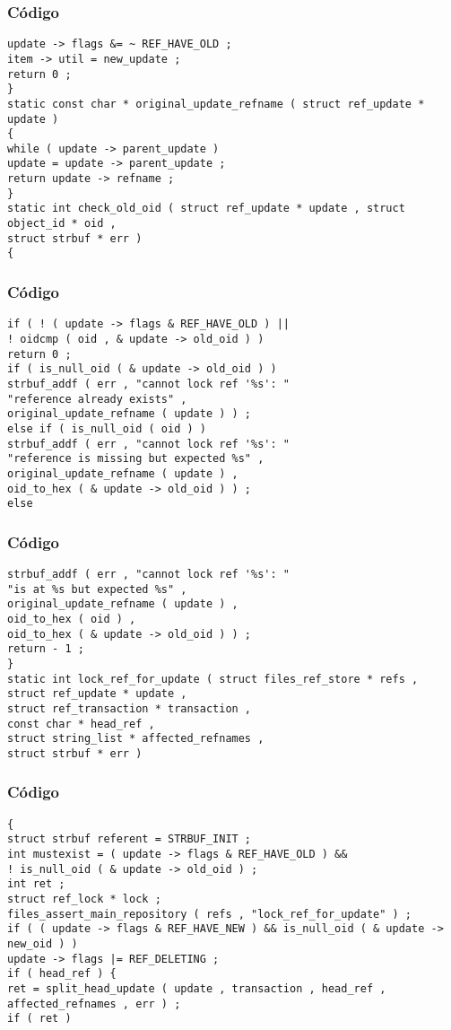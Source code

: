\documentclass{beamer}
\begin{document}
\begin{frame}[fragile]
\frametitle{C\'odigo}
\begin{verbatim}
update -> flags &= ~ REF_HAVE_OLD ; 
item -> util = new_update ; 
return 0 ; 
} 
static const char * original_update_refname ( struct ref_update * update ) 
{ 
while ( update -> parent_update ) 
update = update -> parent_update ; 
return update -> refname ; 
} 
static int check_old_oid ( struct ref_update * update , struct object_id * oid , 
struct strbuf * err ) 
{ 
\end{verbatim}
\end{frame}
\begin{frame}[fragile]
\frametitle{C\'odigo}
\begin{verbatim}
if ( ! ( update -> flags & REF_HAVE_OLD ) || 
! oidcmp ( oid , & update -> old_oid ) ) 
return 0 ; 
if ( is_null_oid ( & update -> old_oid ) ) 
strbuf_addf ( err , "cannot lock ref '%s': " 
"reference already exists" , 
original_update_refname ( update ) ) ; 
else if ( is_null_oid ( oid ) ) 
strbuf_addf ( err , "cannot lock ref '%s': " 
"reference is missing but expected %s" , 
original_update_refname ( update ) , 
oid_to_hex ( & update -> old_oid ) ) ; 
else 
\end{verbatim}
\end{frame}
\begin{frame}[fragile]
\frametitle{C\'odigo}
\begin{verbatim}
strbuf_addf ( err , "cannot lock ref '%s': " 
"is at %s but expected %s" , 
original_update_refname ( update ) , 
oid_to_hex ( oid ) , 
oid_to_hex ( & update -> old_oid ) ) ; 
return - 1 ; 
} 
static int lock_ref_for_update ( struct files_ref_store * refs , 
struct ref_update * update , 
struct ref_transaction * transaction , 
const char * head_ref , 
struct string_list * affected_refnames , 
struct strbuf * err ) 
\end{verbatim}
\end{frame}
\begin{frame}[fragile]
\frametitle{C\'odigo}
\begin{verbatim}
{ 
struct strbuf referent = STRBUF_INIT ; 
int mustexist = ( update -> flags & REF_HAVE_OLD ) && 
! is_null_oid ( & update -> old_oid ) ; 
int ret ; 
struct ref_lock * lock ; 
files_assert_main_repository ( refs , "lock_ref_for_update" ) ; 
if ( ( update -> flags & REF_HAVE_NEW ) && is_null_oid ( & update -> new_oid ) ) 
update -> flags |= REF_DELETING ; 
if ( head_ref ) { 
ret = split_head_update ( update , transaction , head_ref , 
affected_refnames , err ) ; 
if ( ret ) 
\end{verbatim}
\end{frame}
\end{document}
